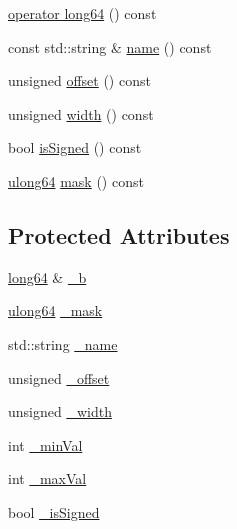 \begin{DoxyCompactItemize}
\item 
\hyperlink{class_d_d4hep_1_1_d_d_segmentation_1_1_bit_field_value_a12c287efc1ff28225a05df20dafa47a3}{operator long64} () const
\item 
const std\+::string \& \hyperlink{class_d_d4hep_1_1_d_d_segmentation_1_1_bit_field_value_a9f9c250d23c05ff2695d9ec4e2b7ffc9}{name} () const
\item 
unsigned \hyperlink{class_d_d4hep_1_1_d_d_segmentation_1_1_bit_field_value_ab8aa1a30c457ac06641276a2e10e647d}{offset} () const
\item 
unsigned \hyperlink{class_d_d4hep_1_1_d_d_segmentation_1_1_bit_field_value_a2a64900a949635b4d1bbefe5a61529c3}{width} () const
\item 
bool \hyperlink{class_d_d4hep_1_1_d_d_segmentation_1_1_bit_field_value_a88c3e24e7a8f11f4afd4d314428fb0f9}{is\+Signed} () const
\item 
\hyperlink{namespace_d_d4hep_a7a8348d075fd0a3bafc06de7cde7a750}{ulong64} \hyperlink{class_d_d4hep_1_1_d_d_segmentation_1_1_bit_field_value_a537266df448c372b64ea6c4f1185a4c5}{mask} () const
\end{DoxyCompactItemize}
\subsection*{Protected Attributes}
\begin{DoxyCompactItemize}
\item 
\hyperlink{namespace_d_d4hep_ac2a70e722b33dc7ddaa20db8954ac836}{long64} \& \hyperlink{class_d_d4hep_1_1_d_d_segmentation_1_1_bit_field_value_a0105c82bf79092f583b6c88f2e34267a}{\+\_\+b}
\item 
\hyperlink{namespace_d_d4hep_a7a8348d075fd0a3bafc06de7cde7a750}{ulong64} \hyperlink{class_d_d4hep_1_1_d_d_segmentation_1_1_bit_field_value_a26159ffbb10cef7fa2ed73f9db058465}{\+\_\+mask}
\item 
std\+::string \hyperlink{class_d_d4hep_1_1_d_d_segmentation_1_1_bit_field_value_a0fe0475b6dcbe318bcba73096a20eb2f}{\+\_\+name}
\item 
unsigned \hyperlink{class_d_d4hep_1_1_d_d_segmentation_1_1_bit_field_value_aaec5eef97c6b194e309a3467fedb391c}{\+\_\+offset}
\item 
unsigned \hyperlink{class_d_d4hep_1_1_d_d_segmentation_1_1_bit_field_value_afe3513613815254bce43b62ef21b9f20}{\+\_\+width}
\item 
int \hyperlink{class_d_d4hep_1_1_d_d_segmentation_1_1_bit_field_value_a3e346b329d28bc181bde2f9475b6e1bd}{\+\_\+min\+Val}
\item 
int \hyperlink{class_d_d4hep_1_1_d_d_segmentation_1_1_bit_field_value_acc0f6833b9cf96123403bd90f7f70823}{\+\_\+max\+Val}
\item 
bool \hyperlink{class_d_d4hep_1_1_d_d_segmentation_1_1_bit_field_value_a22e42eb6cbef6b643840f09dccac5f42}{\+\_\+is\+Signed}
\end{DoxyCompactItemize}


